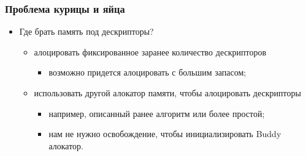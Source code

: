 \begin{frame}
\frametitle{Проблема курицы и яйца}
\begin{itemize}
  \item Где брать память под дескрипторы?
  \begin{itemize}
    \item алоцировать фиксированное заранее количество дескрипторов
    \begin{itemize}
      \item возможно придется алоцировать с большим запасом;
    \end{itemize}
    \item использовать другой алокатор памяти, чтобы алоцировать дескрипторы
    \begin{itemize}
      \item например, описанный ранее алгоритм или более простой;
      \item нам не нужно освобождение, чтобы инициализировать Buddy алокатор.
    \end{itemize}
  \end{itemize}
\end{itemize}
\end{frame}
